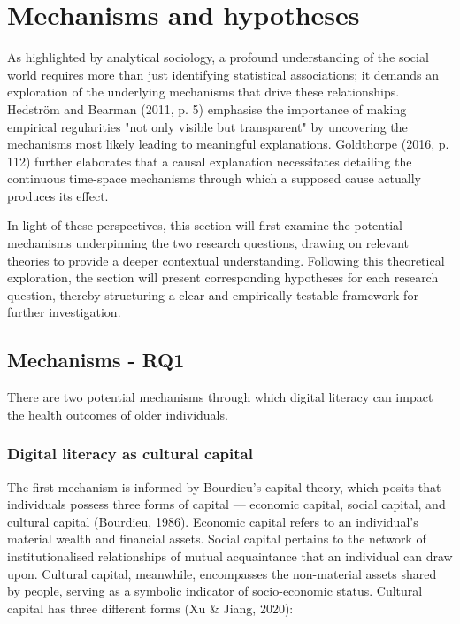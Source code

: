 \chapter{\label{ch:3-hypothesis}Mechanisms and hypotheses}

As highlighted by analytical sociology, a profound understanding of the social world requires more than just identifying statistical associations; it demands an exploration of the underlying mechanisms that drive these relationships. Hedström and Bearman (2011, p. 5) emphasise the importance of making empirical regularities "not only visible but transparent" by uncovering the mechanisms most likely leading to meaningful explanations. Goldthorpe (2016, p. 112) further elaborates that a causal explanation necessitates detailing the continuous time-space mechanisms through which a supposed cause actually produces its effect. 

In light of these perspectives, this section will first examine the potential mechanisms underpinning the two research questions, drawing on relevant theories to provide a deeper contextual understanding. Following this theoretical exploration, the section will present corresponding hypotheses for each research question, thereby structuring a clear and empirically testable framework for further investigation.

\section{Mechanisms - RQ1}
There are two potential mechanisms through which digital literacy can impact the health outcomes of older individuals. 

\subsection{Digital literacy as cultural capital}
The first mechanism is informed by Bourdieu's capital theory, which posits that individuals possess three forms of capital — economic capital, social capital, and cultural capital (Bourdieu, 1986). Economic capital refers to an individual's material wealth and financial assets. Social capital pertains to the network of institutionalised relationships of mutual acquaintance that an individual can draw upon. Cultural capital, meanwhile, encompasses the non-material assets shared by people, serving as a symbolic indicator of socio-economic status. Cultural capital has three different forms (Xu \& Jiang, 2020):

